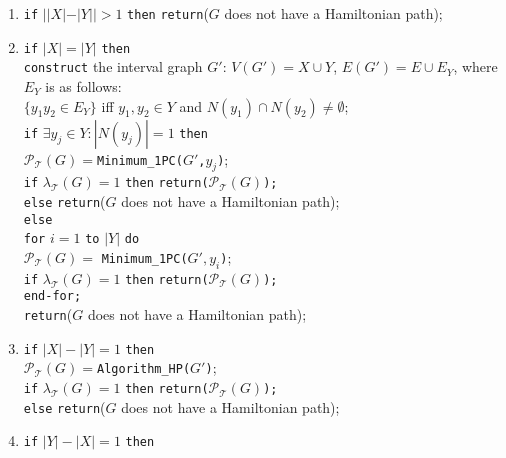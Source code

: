 \documentclass[10pt]{article}
\begin{document}
{\begin{enumerate}
  \item {\tt if} $||X|-|Y||>1$ {\tt then} {\tt return}($G$ does not have a Hamiltonian path);
  \item {\tt if} $|X|=|Y|$ {\tt then} \\
         \phantom{if} {\tt construct} the interval graph $G'$: $V(G')=X \cup Y$, $E(G')=E \cup E_Y$,
         where $E_Y$ is as follows: \\
         \phantom{if} \phantom{if} \phantom{if} $\{y_1y_2 \in E_Y\}$ iff $y_1,y_2 \in Y$ and $N(y_1) \cap N(y_2) \neq \emptyset$;\\
         \phantom{if} {\tt if} $\exists y_j \in Y:|N(y_j)|=1$ {\tt then} \\
         \phantom{if} \phantom{if} \phantom{if} $\mathcal{P}_\mathcal{T}(G)=${\tt Minimum\_1PC($G'$,$y_j$)};\\
         \phantom{if} \phantom{if} \phantom{if} {\tt if} $\lambda_\mathcal{T}(G)=1$
         {\tt then} {\tt return($\mathcal{P}_\mathcal{T}(G)$);}\\
         \phantom{if} \phantom{if} \phantom{if} {\tt else} {\tt return}($G$ does not have a Hamiltonian path);\\
         \phantom{if} {\tt else} \\
         \phantom{if} \phantom{if} \phantom{if} {\tt for} $i=1$ {\tt to} $|Y|$ {\tt do} \\
         \phantom{if} \phantom{if} \phantom{if} \phantom{for} $\mathcal{P}_\mathcal{T}(G)=$ {\tt Minimum\_1PC($G',y_i$)};\\
         \phantom{if} \phantom{if} \phantom{if} \phantom{for} {\tt if} $\lambda_\mathcal{T}(G)=1$ {\tt then} {\tt return($\mathcal{P}_\mathcal{T}(G)$);}\\
         \phantom{if} \phantom{if} \phantom{if} {\tt end-for;}\\
         \phantom{if} \phantom{if} \phantom{if} {\tt return}($G$ does not have a Hamiltonian path);
  \item {\tt if} $|X|-|Y|=1$ {\tt then} \\
         \phantom{if} $\mathcal{P}_\mathcal{T}(G)=${\tt Algorithm\_HP($G'$)};\\
         \phantom{if} {\tt if} $\lambda_\mathcal{T}(G)=1$ {\tt then} {\tt return($\mathcal{P}_\mathcal{T}(G)$);}\\
         \phantom{if} {\tt else} {\tt return}($G$ does not have a Hamiltonian path);
  \item {\tt if} $|Y|-|X|=1$ {\tt then} \\

\end{enumerate}}
\end{document}
